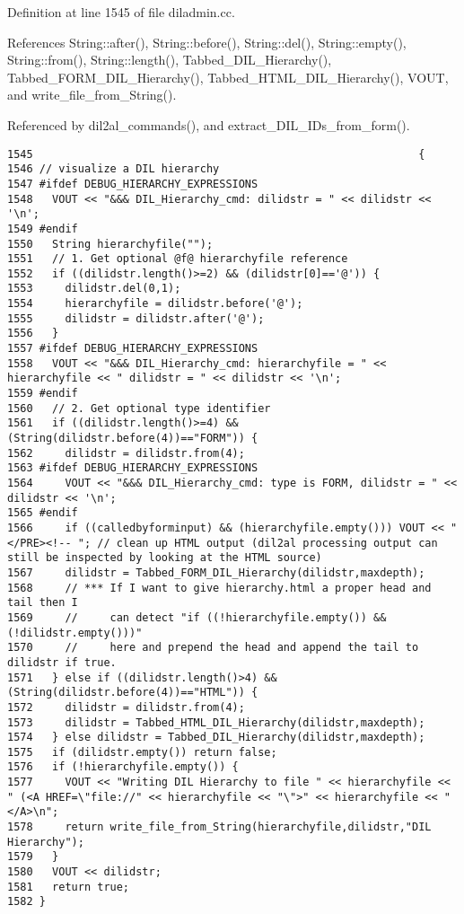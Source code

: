 Definition at line 1545 of file diladmin.cc.

References String::after(), String::before(), String::del(), String::empty(), String::from(), String::length(), Tabbed\_\-DIL\_\-Hierarchy(), Tabbed\_\-FORM\_\-DIL\_\-Hierarchy(), Tabbed\_\-HTML\_\-DIL\_\-Hierarchy(), VOUT, and write\_\-file\_\-from\_\-String().

Referenced by dil2al\_\-commands(), and extract\_\-DIL\_\-IDs\_\-from\_\-form().



\footnotesize\begin{verbatim}1545                                                            {
1546 // visualize a DIL hierarchy
1547 #ifdef DEBUG_HIERARCHY_EXPRESSIONS
1548   VOUT << "&&& DIL_Hierarchy_cmd: dilidstr = " << dilidstr << '\n';
1549 #endif
1550   String hierarchyfile("");
1551   // 1. Get optional @f@ hierarchyfile reference
1552   if ((dilidstr.length()>=2) && (dilidstr[0]=='@')) {
1553     dilidstr.del(0,1);
1554     hierarchyfile = dilidstr.before('@');
1555     dilidstr = dilidstr.after('@');
1556   }
1557 #ifdef DEBUG_HIERARCHY_EXPRESSIONS
1558   VOUT << "&&& DIL_Hierarchy_cmd: hierarchyfile = " << hierarchyfile << " dilidstr = " << dilidstr << '\n';
1559 #endif
1560   // 2. Get optional type identifier
1561   if ((dilidstr.length()>=4) && (String(dilidstr.before(4))=="FORM")) {
1562     dilidstr = dilidstr.from(4);
1563 #ifdef DEBUG_HIERARCHY_EXPRESSIONS
1564     VOUT << "&&& DIL_Hierarchy_cmd: type is FORM, dilidstr = " << dilidstr << '\n';
1565 #endif
1566     if ((calledbyforminput) && (hierarchyfile.empty())) VOUT << "</PRE><!-- "; // clean up HTML output (dil2al processing output can still be inspected by looking at the HTML source)
1567     dilidstr = Tabbed_FORM_DIL_Hierarchy(dilidstr,maxdepth);
1568     // *** If I want to give hierarchy.html a proper head and tail then I
1569     //     can detect "if ((!hierarchyfile.empty()) && (!dilidstr.empty()))"
1570     //     here and prepend the head and append the tail to dilidstr if true.
1571   } else if ((dilidstr.length()>4) && (String(dilidstr.before(4))=="HTML")) {
1572     dilidstr = dilidstr.from(4);
1573     dilidstr = Tabbed_HTML_DIL_Hierarchy(dilidstr,maxdepth);
1574   } else dilidstr = Tabbed_DIL_Hierarchy(dilidstr,maxdepth);
1575   if (dilidstr.empty()) return false;
1576   if (!hierarchyfile.empty()) {
1577     VOUT << "Writing DIL Hierarchy to file " << hierarchyfile << " (<A HREF=\"file://" << hierarchyfile << "\">" << hierarchyfile << "</A>\n";
1578     return write_file_from_String(hierarchyfile,dilidstr,"DIL Hierarchy");
1579   }
1580   VOUT << dilidstr;
1581   return true;
1582 }
\end{verbatim}\normalsize 
{}
